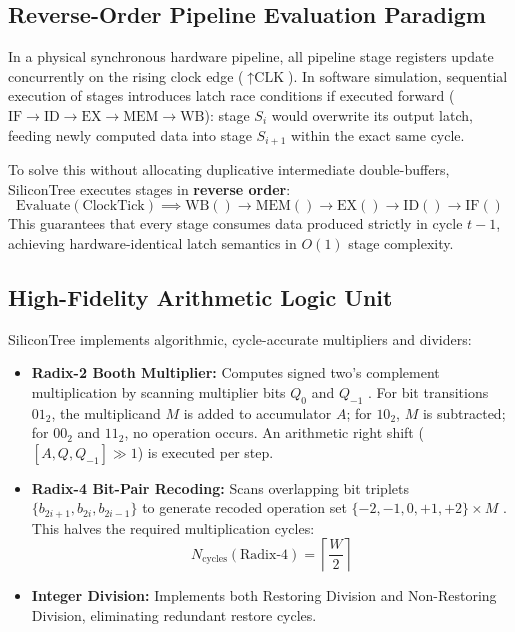 \documentclass[journal,twocolumn,10pt]{IEEEtran}
\begin{document}
\subsection{Reverse-Order Pipeline Evaluation Paradigm}
In a physical synchronous hardware pipeline, all pipeline stage registers update concurrently on the rising clock edge ($\uparrow \text{CLK}$). In software simulation, sequential execution of stages introduces latch race conditions if executed forward ($\text{IF} \to \text{ID} \to \text{EX} \to \text{MEM} \to \text{WB}$): stage $S_i$ would overwrite its output latch, feeding newly computed data into stage $S_{i+1}$ within the exact same cycle.

To solve this without allocating duplicative intermediate double-buffers, SiliconTree executes stages in \textbf{reverse order}:
\begin{equation}
\text{Evaluate}(\text{ClockTick}) \implies \text{WB}() \to \text{MEM}() \to \text{EX}() \to \text{ID}() \to \text{IF}()
\end{equation}
This guarantees that every stage consumes data produced strictly in cycle $t-1$, achieving hardware-identical latch semantics in $O(1)$ stage complexity.

\subsection{High-Fidelity Arithmetic Logic Unit}
SiliconTree implements algorithmic, cycle-accurate multipliers and dividers:
\begin{itemize}
    \item \textbf{Radix-2 Booth Multiplier:} Computes signed two's complement multiplication by scanning multiplier bits $Q_0$ and $Q_{-1}$ \cite{booth1951}. For bit transitions $01_2$, the multiplicand $M$ is added to accumulator $A$; for $10_2$, $M$ is subtracted; for $00_2$ and $11_2$, no operation occurs. An arithmetic right shift ($[A, Q, Q_{-1}] \gg 1$) is executed per step.
    \item \textbf{Radix-4 Bit-Pair Recoding:} Scans overlapping bit triplets $\{b_{2i+1}, b_{2i}, b_{2i-1}\}$ to generate recoded operation set $\{-2, -1, 0, +1, +2\} \times M$ \cite{macsorley1961}. This halves the required multiplication cycles:
    \begin{equation}
    N_{\text{cycles}}(\text{Radix-4}) = \left\lceil \frac{W}{2} \right\rceil
    \end{equation}
    \item \textbf{Integer Division:} Implements both Restoring Division and Non-Restoring Division, eliminating redundant restore cycles.
\end{itemize}
\end{document}
